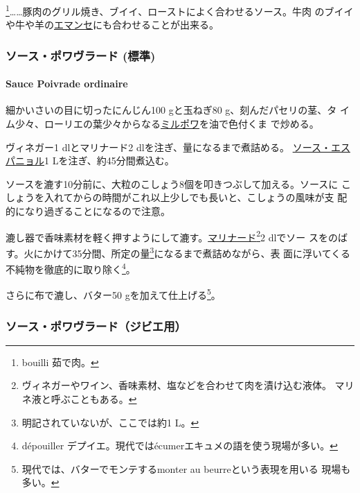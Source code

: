 \footnote{bouilli 茹で肉。}\ldots{}\ldots{}豚肉のグリル焼き、ブイイ、ローストによく合わせるソース。牛肉
のブイイや牛や羊の\href{}{エマンセ}にも合わせることが出来る。

\maeaki

\hypertarget{ux30bdux30fcux30b9ux30ddux30efux30f4ux30e9ux30fcux30c9-ux6a19ux6e96}{%
\subsubsection{ソース・ポワヴラード
(標準)}\label{ux30bdux30fcux30b9ux30ddux30efux30f4ux30e9ux30fcux30c9-ux6a19ux6e96}}

\hypertarget{sauce-poivrade}{%
\paragraph{Sauce Poivrade ordinaire}\label{sauce-poivrade}}

   

細かいさいの目に切ったにんじん100 gと玉ねぎ80 g、刻んだパセリの茎、タ
イム少々、ローリエの葉少々からなる\protect\hyperlink{mirepoix}{ミルポワ}を油で色付くま
で炒める。

ヴィネガー1 dlとマリナード2 dlを注ぎ、\untiers{}量になるまで煮詰める。
\protect\hyperlink{sauce-espagnole}{ソース・エスパニョル}1
Lを注ぎ、約45分間煮込む。

ソースを漉す10分前に、大粒のこしょう8個を叩きつぶして加える。ソースに
こしょうを入れてからの時間がこれ以上少しでも長いと、こしょうの風味が支
配的になり過ぎることになるので注意。

漉し器で香味素材を軽く押すようにして漉す。\href{}{マリナード}\footnote{ヴィネガーやワイン、香味素材、塩などを合わせて肉を漬け込む液体。
  マリネ液と呼ぶこともある。}2 dlでソー
スをのばす。火にかけて35分間、所定の量\footnote{明記されていないが、ここでは約1
  L。}になるまで煮詰めながら、表
面に浮いてくる不純物を徹底的に取り除く\footnote{dépouiller
  デプイエ。現代ではécumerエキュメの語を使う現場が多い。}。

さらに布で漉し、バター50 gを加えて仕上げる\footnote{現代では、バターでモンテするmonter
  au beurreという表現を用いる 現場も多い。}。

\maeaki

\hypertarget{ux30bdux30fcux30b9ux30ddux30efux30f4ux30e9ux30fcux30c9ux30b8ux30d3ux30a8ux7528}{%
\subsubsection{ソース・ポワヴラード（ジビエ用）}\label{ux30bdux30fcux30b9ux30ddux30efux30f4ux30e9ux30fcux30c9ux30b8ux30d3ux30a8ux7528}}

